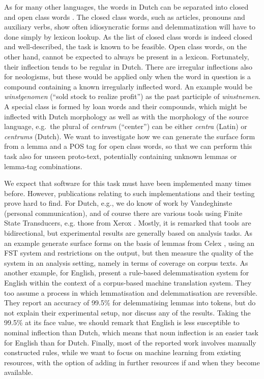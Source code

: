 \documentclass[a4paper,10pt,twoside]{article}
\begin{document}
As for many other languages, the words in Dutch can be separated into closed and open class words \cite{REFbooij}. The closed class words, such as articles, pronouns and auxiliary verbs, show often idiosyncratic forms and delemmatization will have to done simply by lexicon lookup. As the list of closed class words is indeed closed and well-described, the task is known to be feasible. Open class words, on the other hand, cannot be expected to always be present in a lexicon. Fortunately, their inflection tends to be regular in Dutch. There are irregular inflections also for neologisms, but these would be applied only when the word in question is a compound containing a known irregularly inflected word. An example would be \textit{winstgenomen} (``sold stock to realize profit'') as the past participle of \textit{winstnemen}. A special class is formed by loan words and their compounds, which might be inflected with Dutch morphology as well as with the morphology of the source language, e.g.\ the plural of \textit{centrum} (``center'') can be either \textit{centra} (Latin) or \textit{centrums} (Dutch). We want to investigate how we can generate the surface form from a lemma and a POS tag for open class words, so that we can perform this task also for unseen proto-text, potentially containing unknown lemmas or lemma-tag combinations. 

We expect that software for this task must have been implemented many times before. However, publications relating to such implementations and their testing prove hard to find. For Dutch, e.g., we do know of work by Vandeghinste (personal communication), and of course there are various tools using Finite State Transducers, e.g. those from Xerox \cite{REFxerox,REFbeesley}. Mostly, it is remarked that tools are bidirectional, but experimental results are generally based on analysis tasks. As an example  generate surface forms on the basis of lemmas from Celex \cite{REFcelex}, using an FST system and restrictions on the output, but then measure the quality of the system in an analysis setting, namely in terms of coverage on corpus texts. As another example, for English,  present a rule-based delemmatisation system for English within the context of a corpus-based machine translation system. They too assume a process in which lemmatisation and delemmatisation are reversible. They report an accuracy of 99.5\% for delemmatising lemmas into tokens, but do not explain their experimental setup, nor discuss any of the results. Taking the 99.5\% at its face value, we should remark that English is less susceptible to nominal inflection than Dutch, which means that noun inflection is an easier task for English than for Dutch. Finally, most of the reported work involves manually constructed rules, while we want to focus on machine learning from existing resources, with the option of adding in further resources if and when they become available. 
\end{document}
